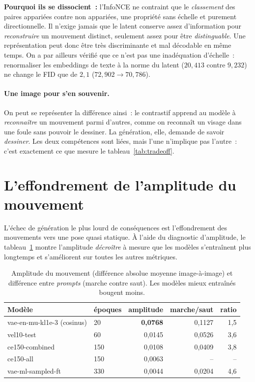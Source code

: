 \documentclass[12pt,a4paper,oneside]{report}
\theoremstyle{definition}
\theoremstyle{plain}
\begin{document}
\textbf{Pourquoi ils se dissocient~:} l'InfoNCE ne contraint que le \emph{classement}
des paires appariées contre non appariées, une propriété sans échelle et purement
directionnelle. Il n'exige jamais que le latent conserve assez d'information pour
\emph{reconstruire} un mouvement distinct, seulement assez pour être
\emph{distinguable}. Une représentation peut donc être très discriminante et mal
décodable en même temps. On a par ailleurs vérifié que ce n'est pas une inadéquation
d'échelle~: renormaliser les embeddings de texte à la norme du latent ($20{,}413$
contre $9{,}232$) ne change le FID que de $2{,}1$ ($72{,}902\to70{,}786$).

\paragraph{Une image pour s'en souvenir.} On peut se représenter la différence
ainsi~: le contrastif apprend au modèle à \emph{reconnaître} un mouvement parmi
d'autres, comme on reconnaît un visage dans une foule sans pouvoir le dessiner. La
génération, elle, demande de savoir \emph{dessiner}. Les deux compétences sont
liées, mais l'une n'implique pas l'autre~: c'est exactement ce que mesure le
tableau~\ref{tab:tradeoff}.

\section{L'effondrement de l'amplitude du mouvement}
\label{sec:amplitude}

L'échec de génération le plus lourd de conséquences est l'effondrement des
mouvements vers une pose quasi statique. À l'aide du diagnostic d'amplitude, le
tableau~\ref{tab:amplitude} montre l'amplitude \emph{décroître} à mesure que les
modèles s'entraînent plus longtemps et s'améliorent sur toutes les autres
métriques.

\begin{table}[ht]
\centering
\caption{Amplitude du mouvement (différence absolue moyenne image-à-image) et
différence entre \emph{prompts} (marche contre saut). Les modèles mieux entraînés
bougent moins.}
\label{tab:amplitude}
\small
\begin{tabular}{@{}llrrr@{}}
\toprule
Modèle & époques & amplitude & marche/saut & ratio \\
\midrule
vae-en-mu-kl1e-3 (cosinus) & 20  & \textbf{0,0768} & 0,1127 & 1,5 \\
vel10-test                & 60  & 0,0145 & 0,0526 & 3,6 \\
ce150-combined            & 150 & 0,0108 & 0,0409 & 3,8 \\
ce150-all                 & 150 & 0,0063 & --    & -- \\
vae-ml-sampled-ft         & 330 & 0,0044 & 0,0204 & 4,6 \\
\bottomrule
\end{tabular}
\end{table}
\end{document}
